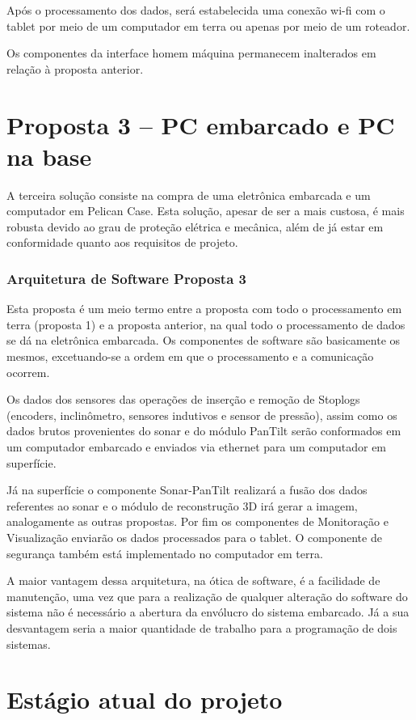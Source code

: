 Após o processamento dos dados, será estabelecida uma conexão wi-fi com o tablet
por meio de um computador em terra ou
 apenas por meio de um roteador.
 
Os componentes da interface homem máquina permanecem inalterados em relação à
proposta anterior.
 

\section{Proposta 3 – PC embarcado e PC na base}

A terceira solução consiste na compra de uma eletrônica embarcada e um
computador em Pelican Case. Esta solução, apesar de ser a mais custosa, é mais
robusta devido ao grau de proteção elétrica e mecânica, além de já estar em
conformidade quanto aos requisitos de projeto.

\subsubsection{Arquitetura de Software Proposta 3}
Esta proposta é um meio termo entre a proposta com todo o processamento em terra
(proposta 1) e a proposta anterior, na qual todo o processamento de dados se dá
na eletrônica embarcada. Os componentes de software são basicamente os mesmos,
excetuando-se a ordem em que o processamento e a comunicação ocorrem.

Os dados dos sensores das operações de inserção e remoção de Stoplogs
(encoders, inclinômetro, sensores indutivos e sensor de pressão), assim como os
dados brutos provenientes do sonar e do módulo PanTilt serão conformados em um
computador embarcado e enviados via ethernet para um computador em superfície.

Já na superfície o componente Sonar-PanTilt realizará a fusão dos dados
referentes ao sonar e o módulo de reconstrução 3D irá gerar a imagem,
analogamente as outras propostas. Por fim os componentes de Monitoração e
Visualização enviarão os dados processados para o tablet. O componente de
segurança também está implementado no computador em terra.

A maior vantagem dessa arquitetura, na ótica de software, é a facilidade de
manutenção, uma vez que para a realização de qualquer alteração do software do
sistema não é necessário a abertura da envólucro do sistema embarcado. Já a sua
desvantagem seria a maior quantidade de trabalho para a programação de dois
sistemas.

\section{Estágio atual do projeto}

